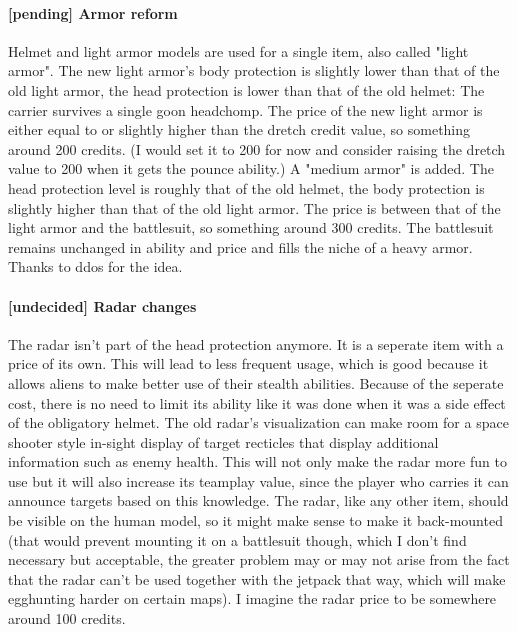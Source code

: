 \documentclass{scrartcl}
\newcommand{\undecided}[0]{\textcolor{undecided}{\textbf{[undecided] }}}
\newcommand{\pending}  [0]{\textcolor{pending}  {\textbf{[pending] }}}
\begin{document}
\paragraph{\pending Armor reform}

Helmet and light armor models are used for a single item, also called "light armor". The new light armor's body protection is slightly lower than that of the old light armor, the head protection is lower than that of the old helmet: The carrier survives a single goon headchomp. The price of the new light armor is either equal to or slightly higher than the dretch credit value, so something around 200 credits. (I would set it to 200 for now and consider raising the dretch value to 200 when it gets the pounce ability.) A "medium armor" is added. The head protection level is roughly that of the old helmet, the body protection is slightly higher than that of the old light armor. The price is between that of the light armor and the battlesuit, so something around 300 credits. The battlesuit remains unchanged in ability and price and fills the niche of a heavy armor. Thanks to ddos for the idea.

\paragraph{\undecided Radar changes}

The radar isn't part of the head protection anymore. It is a seperate item with a price of its own. This will lead to less frequent usage, which is good because it allows aliens to make better use of their stealth abilities. Because of the seperate cost, there is no need to limit its ability like it was done when it was a side effect of the obligatory helmet. The old radar's visualization can make room for a space shooter style in-sight display of target recticles that display additional information such as enemy health. This will not only make the radar more fun to use but it will also increase its teamplay value, since the player who carries it can announce targets based on this knowledge. The radar, like any other item, should be visible on the human model, so it might make sense to make it back-mounted (that would prevent mounting it on a battlesuit though, which I don't find necessary but acceptable, the greater problem may or may not arise from the fact that the radar can't be used together with the jetpack that way, which will make egghunting harder on certain maps). I imagine the radar price to be somewhere around 100 credits.
\end{document}
